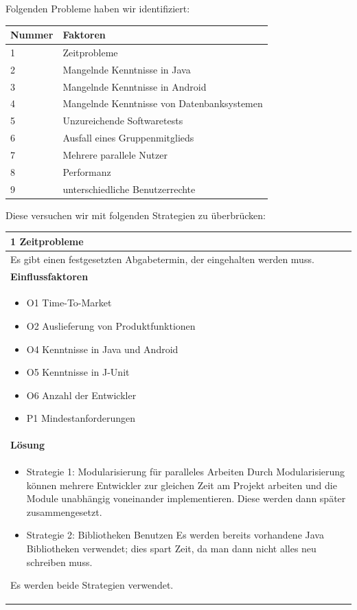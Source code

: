 \documentclass[fontsize=12pt,paper=a4,twoside]{scrartcl}
\begin{document}
Folgenden Probleme haben wir identifiziert:\\

\begin{table}[H]
\centering
\begin{tabular}{|l|l|}\hline
\textbf{Nummer} & \textbf{Faktoren}\\ \hline \hline
1 & Zeitprobleme\\ \hline
2 & Mangelnde Kenntnisse in Java\\ \hline
3 & Mangelnde Kenntnisse in Android\\ \hline
4 & Mangelnde Kenntnisse von Datenbanksystemen\\ \hline
5 & Unzureichende Softwaretests\\ \hline
6 & Ausfall eines Gruppenmitglieds\\ \hline
7 & Mehrere parallele Nutzer\\ \hline
8 & Performanz\\ \hline
9 & unterschiedliche Benutzerrechte\\ \hline
\end{tabular}
\end{table}

Diese versuchen wir mit folgenden Strategien zu überbrücken:\\

\begin{table}[H]
\begin{tabular}{|p{\textwidth}|}\hline
1 Zeitprobleme\\ \hline
Es gibt einen festgesetzten Abgabetermin, der eingehalten werden muss.\\ \hline
\textbf{Einflussfaktoren}\\
\begin{itemize}
\item O1 Time-To-Market
\item O2 Auslieferung von Produktfunktionen
\item O4 Kenntnisse in Java  und Android
\item O5 Kenntnisse in J-Unit
\item O6 Anzahl der Entwickler
\item P1 Mindestanforderungen
\end{itemize}\\ \hline
\textbf{Lösung}\\
\begin{itemize}
\item Strategie 1: Modularisierung für paralleles Arbeiten \leavevmode\newline
Durch Modularisierung können mehrere Entwickler zur gleichen Zeit am Projekt arbeiten und die Module unabhängig voneinander implementieren. Diese werden dann später zusammengesetzt.
\item Strategie 2: Bibliotheken Benutzen \leavevmode\newline
Es werden bereits vorhandene Java Bibliotheken verwendet; dies spart Zeit, da man dann nicht alles neu schreiben muss.
\end{itemize}
Es werden beide Strategien verwendet.\\ \hline
\end{tabular}
\end{table}
\end{document}
